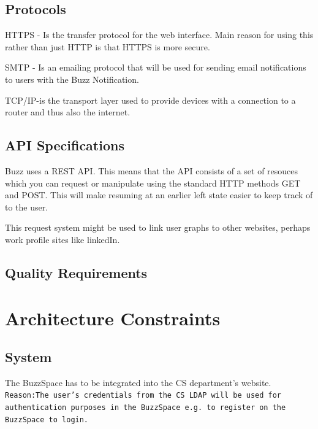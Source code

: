 \documentclass[a4paper,12pt]{report}
\begin{document}
\subsection{Protocols}
\begin{description}
\item HTTPS - Is the transfer protocol for the web interface. Main reason for using this rather than just HTTP is that HTTPS is more secure.
\item SMTP - Is an emailing protocol that will be used for sending email notifications to users with the Buzz Notification.	
\item TCP/IP-is the transport layer used to provide devices with a connection to a router 
	and thus also the internet.
\end{description}
\subsection{API Specifications}
\begin{description}
\item Buzz uses a REST API. This means that the API consists of a set of resouces which you can request or manipulate using the standard HTTP methods GET and POST. This will make resuming at an earlier left state easier to keep track of to the user.
\item This request system might be used to link user graphs to other websites, perhaps work profile sites like linkedIn.
\end{description}
\subsection{Quality Requirements}

\newpage
\section{Architecture Constraints}

\subsection{System}
	\begin{description}
\item The BuzzSpace has to be integrated into the CS department’s website. \\
\texttt{Reason:The user’s credentials from the CS LDAP will be used for authentication
purposes in the BuzzSpace e.g. to register on the BuzzSpace to login.}
\end{description}
\end{document}
